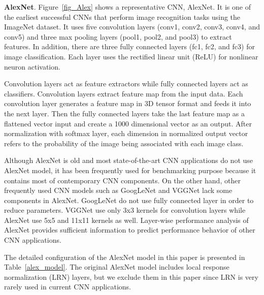 {\bf AlexNet}. Figure~\ref{fig_Alex} shows a representative CNN, AlexNet\cite{krizhevsky2012imagenet}. It is one of the earliest successful CNNs that perform image recognition tasks using the ImageNet dataset\cite{DBLP:journals/corr/RussakovskyDSKSMHKKBBF14}. It uses five convolution layers (\textsf{conv1}, \textsf{conv2}, \textsf{conv3}, \textsf{conv4}, and \textsf{conv5}) and three max pooling layers (\textsf{pool1}, \textsf{pool2}, and \textsf{pool3}) to extract features. In addition, there are three fully connected layers (\textsf{fc1}, \textsf{fc2}, and \textsf{fc3}) for image classification. Each layer uses the rectified linear unit (ReLU) for nonlinear neuron activation. 

Convolution layers act as feature extractors while fully connected layers act as classifiers. Convolution layers extract feature map from the input data. Each convolution layer generates a feature map in 3D tensor format and feeds it into the next layer. Then the fully connected layers take the last feature map as a flattened vector input and create a 1000 dimensional vector as an output. After normalization with softmax layer, each dimension in normalized output vector refers to the probability of the image being associated with each image class.

Although AlexNet is old and most state-of-the-art CNN applications do not use AlexNet model, it has been frequently used for benchmarking purpose because it contains most of contemporary CNN components.
On the other hand, other frequently used CNN models such as GoogLeNet and VGGNet lack some components in AlexNet. GoogLeNet \cite{googlenet} do not use fully connected layer in order to reduce parameters. VGGNet use only 3x3 kernels for convolution layers while AlexNet use 5x5 and 11x11 kernels as well.
Layer-wise performance analysis of AlexNet provides sufficient information to predict performance behavior of other CNN applications.

The detailed configuration of the AlexNet model in this paper is presented in Table~\ref{alex_model}. The original AlexNet model includes local response normalization (LRN) layers, but we exclude them in this paper since LRN is very rarely used in current CNN applications. 

